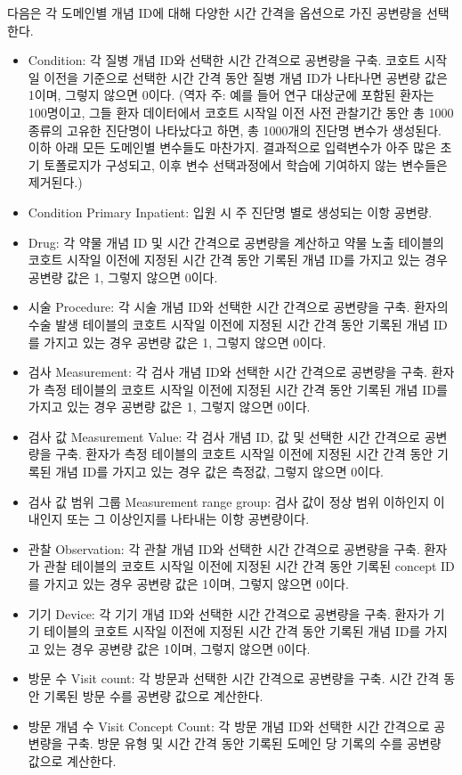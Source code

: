 \documentclass[10.5pt]{book}
\providecommand{\tightlist}{%
  \setlength{\itemsep}{0pt}\setlength{\parskip}{0pt}}
\theoremstyle{definition}
\theoremstyle{definition}
\theoremstyle{definition}
\theoremstyle{remark}
\begin{document}
다음은 각 도메인별 개념 ID에 대해 다양한 시간 간격을 옵션으로 가진
공변량을 선택한다.

\begin{itemize}
\tightlist
\item
  Condition: 각 질병 개념 ID와 선택한 시간 간격으로 공변량을 구축.
  코호트 시작일 이전을 기준으로 선택한 시간 간격 동안 질병 개념 ID가
  나타나면 공변량 값은 1이며, 그렇지 않으면 0이다. (역자 주: 예를 들어
  연구 대상군에 포함된 환자는 100명이고, 그들 환자 데이터에서 코호트
  시작일 이전 사전 관찰기간 동안 총 1000 종류의 고유한 진단명이
  나타났다고 하면, 총 1000개의 진단명 변수가 생성된다. 이하 아래 모든
  도메인별 변수들도 마찬가지. 결과적으로 입력변수가 아주 많은 초기
  토폴로지가 구성되고, 이후 변수 선택과정에서 학습에 기여하지 않는
  변수들은 제거된다.)
\item
  Condition Primary Inpatient: 입원 시 주 진단명 별로 생성되는 이항
  공변량.
\item
  Drug: 각 약물 개념 ID 및 시간 간격으로 공변량을 계산하고 약물 노출
  테이블의 코호트 시작일 이전에 지정된 시간 간격 동안 기록된 개념 ID를
  가지고 있는 경우 공변량 값은 1, 그렇지 않으면 0이다.
\item
  시술 Procedure: 각 시술 개념 ID와 선택한 시간 간격으로 공변량을 구축.
  환자의 수술 발생 테이블의 코호트 시작일 이전에 지정된 시간 간격 동안
  기록된 개념 ID를 가지고 있는 경우 공변량 값은 1, 그렇지 않으면 0이다.
\item
  검사 Measurement: 각 검사 개념 ID와 선택한 시간 간격으로 공변량을
  구축. 환자가 측정 테이블의 코호트 시작일 이전에 지정된 시간 간격 동안
  기록된 개념 ID를 가지고 있는 경우 공변량 값은 1, 그렇지 않으면 0이다.
\item
  검사 값 Measurement Value: 각 검사 개념 ID, 값 및 선택한 시간 간격으로
  공변량을 구축. 환자가 측정 테이블의 코호트 시작일 이전에 지정된 시간
  간격 동안 기록된 개념 ID를 가지고 있는 경우 값은 측정값, 그렇지 않으면
  0이다.
\item
  검사 값 범위 그룹 Measurement range group: 검사 값이 정상 범위
  이하인지 이내인지 또는 그 이상인지를 나타내는 이항 공변량이다.
\item
  관찰 Observation: 각 관찰 개념 ID와 선택한 시간 간격으로 공변량을
  구축. 환자가 관찰 테이블의 코호트 시작일 이전에 지정된 시간 간격 동안
  기록된 concept ID를 가지고 있는 경우 공변량 값은 1이며, 그렇지 않으면
  0이다.
\item
  기기 Device: 각 기기 개념 ID와 선택한 시간 간격으로 공변량을 구축.
  환자가 기기 테이블의 코호트 시작일 이전에 지정된 시간 간격 동안 기록된
  개념 ID를 가지고 있는 경우 공변량 값은 1이며, 그렇지 않으면 0이다.
\item
  방문 수 Visit count: 각 방문과 선택한 시간 간격으로 공변량을 구축.
  시간 간격 동안 기록된 방문 수를 공변량 값으로 계산한다.
\item
  방문 개념 수 Visit Concept Count: 각 방문 개념 ID와 선택한 시간
  간격으로 공변량을 구축. 방문 유형 및 시간 간격 동안 기록된 도메인 당
  기록의 수를 공변량 값으로 계산한다.
\end{itemize}
\end{document}
